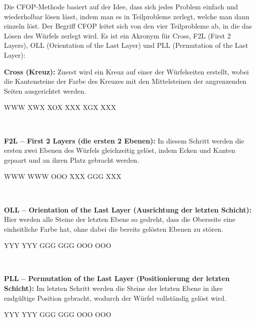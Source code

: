 Die CFOP-Methode basiert auf der Idee, dass sich jedes Problem einfach und wiederholbar lösen lässt, indem man es in Teilprobleme zerlegt, welche man dann einzeln löst.
Der Begriff CFOP leitet sich von den vier Teilprobleme ab, in die das Lösen des Würfels zerlegt wird.
Es ist ein Akronym für Cross, F2L (First 2 Layers), OLL (Orientation of the Last Layer) und PLL (Permutation of the Last Layer):\\[1em]
\parbox{0.7\linewidth}{
\textbf{Cross (Kreuz):} Zuerst wird ein Kreuz auf einer der Würfelseiten erstellt, wobei die Kantensteine der Farbe des Kreuzes mit den Mittelsteinen der angrenzenden Seiten ausgerichtet werden.
}\parbox{0.3\linewidth}{
\centering
\RubikCubeGreyAll%
            {W}{W}{W}
            {X}{W}{X}%
	       {X}{O}{X}
	       {X}{X}{X}%
	       {X}{G}{X}
	       {X}{X}{X}%
}\\[1em]
\parbox{0.7\linewidth}{
\textbf{F2L -- First 2 Layers (die ersten 2 Ebenen):}
In diesem Schritt werden die ersten zwei Ebenen des Würfels gleichzeitig gelöst, indem Ecken und Kanten gepaart und an ihren Platz gebracht werden.
}\parbox{0.3\linewidth}{
\centering
\RubikCubeGreyAll%
            {W}{W}{W}
            {W}{W}{W}%
	       {O}{O}{O}
	       {X}{X}{X}%
	       {G}{G}{G}
	       {X}{X}{X}%
}\\[1em]
\parbox{0.7\linewidth}{
  \textbf{OLL -- Orientation of the Last Layer (Ausrichtung der letzten Schicht):}
  Hier werden alle Steine der letzten Ebene so gedreht, dass die Oberseite eine einheitliche Farbe hat, ohne dabei die bereits gelösten Ebenen zu stören.
}\parbox{0.3\linewidth}{
\centering
\RubikCubeGreyAll%
            {Y}{Y}{Y}
            {Y}{Y}{Y}%
	       {G}{G}{G}
	       {G}{G}{G}%
	       {O}{O}{O}
	       {O}{O}{O}%
}\\[1em]
\parbox{0.7\linewidth}{
  \textbf{PLL -- Permutation of the Last Layer (Positionierung der letzten Schicht):} 
  Im letzten Schritt werden die Steine der letzten Ebene in ihre endgültige Position gebracht, wodurch der Würfel vollständig gelöst wird.
}\parbox{0.3\linewidth}{
\centering
\RubikCubeGreyAll%
            {Y}{Y}{Y}
            {Y}{Y}{Y}%
	       {G}{G}{G}
	       {G}{G}{G}%
	       {O}{O}{O}
	       {O}{O}{O}%
}\\[1em]

